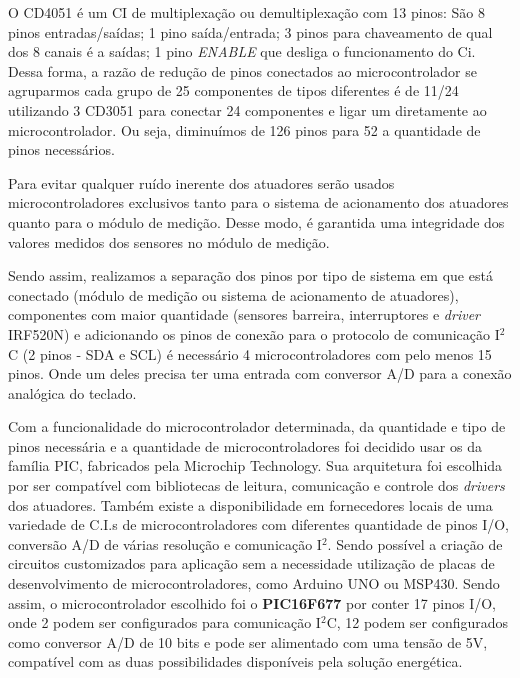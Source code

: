     O CD4051 é um CI de multiplexação ou demultiplexação com 13 pinos: São 8 pinos entradas/saídas; 1 pino saída/entrada; 3 pinos para chaveamento de qual dos 8 canais é a saídas; 1 pino \textit{ENABLE} que desliga o funcionamento do Ci. Dessa forma, a razão de redução de pinos conectados ao microcontrolador se agruparmos cada grupo de 25 componentes de tipos diferentes é de 11/24 utilizando 3 CD3051 para conectar 24 componentes e ligar um diretamente ao microcontrolador. Ou seja, diminuímos de 126 pinos para 52 a quantidade de pinos necessários. 
    
    Para evitar qualquer ruído inerente dos atuadores serão usados microcontroladores exclusivos tanto para o sistema de acionamento dos atuadores quanto para o módulo de medição. Desse modo, é garantida uma integridade dos valores medidos dos sensores no módulo de medição.
    
    Sendo assim, realizamos a separação dos pinos por tipo de sistema em que está conectado (módulo de medição ou sistema de acionamento de atuadores), componentes com maior quantidade (sensores barreira, interruptores e \textit{driver} IRF520N) e adicionando os pinos de conexão para o protocolo de comunicação I$^2$C (2 pinos - SDA e SCL) é necessário 4 microcontroladores com pelo menos 15 pinos. Onde um deles precisa ter uma entrada com conversor A/D para a conexão analógica do teclado. 
    
    Com a funcionalidade do microcontrolador determinada, da quantidade e tipo de pinos necessária e a quantidade de microcontroladores foi decidido usar os da família PIC, fabricados pela Microchip Technology. Sua arquitetura foi escolhida por ser compatível com bibliotecas de leitura, comunicação e controle dos \textit{drivers} dos atuadores. Também existe a disponibilidade em fornecedores locais de uma variedade de C.I.s de microcontroladores com diferentes quantidade de pinos I/O, conversão A/D de várias resolução e comunicação I$^2$. Sendo  possível a criação de circuitos customizados para aplicação sem a necessidade utilização de placas de desenvolvimento de microcontroladores, como Arduino UNO ou MSP430. Sendo assim, o microcontrolador escolhido foi o \textbf{PIC16F677} por conter 17 pinos I/O, onde 2 podem ser configurados para comunicação I$^2$C, 12 podem ser configurados como conversor A/D de 10 bits e pode ser alimentado com uma tensão de 5V, compatível com as duas possibilidades disponíveis pela solução energética.
    
